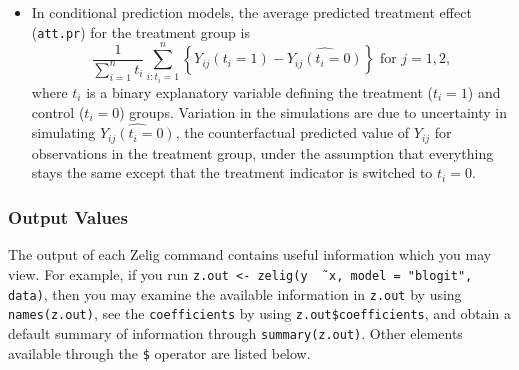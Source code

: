 \begin{itemize}
\item In conditional prediction models, the average predicted treatment
  effect ({\tt att.pr}) for the treatment group is 
    \begin{equation*} \frac{1}{\sum_{i=1}^n t_i}\sum_{i:t_i=1}^n \left\{ Y_{ij}(t_i=1) -
      \widehat{Y_{ij}(t_i=0)} \right\} \textrm{ for } j = 1,2,
    \end{equation*} 
    where $t_i$ is a binary explanatory variable defining the treatment
    ($t_i=1$) and control ($t_i=0$) groups.  Variation in the
    simulations are due to uncertainty in simulating
    $\widehat{Y_{ij}(t_i=0)}$, the counterfactual predicted value of
    $Y_{ij}$ for observations in the treatment group, under the
    assumption that everything stays the same except that the
    treatment indicator is switched to $t_i=0$.
\end{itemize}

\subsubsection{Output Values}

The output of each Zelig command contains useful information which you
may view.  For example, if you run \texttt{z.out <- zelig(y \~\,
  x, model = "blogit", data)}, then you may examine the available
information in \texttt{z.out} by using \texttt{names(z.out)},
see the {\tt coefficients} by using {\tt z.out\$coefficients}, and
obtain a default summary of information through {\tt summary(z.out)}.
Other elements available through the {\tt \$} operator are listed
below.

